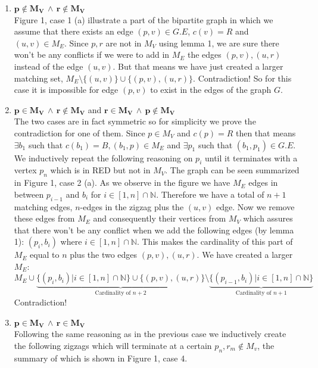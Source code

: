 \documentclass[10pt,a4paper]{article}
\begin{document}
\begin{enumerate}
\item $\mathbf{p \not \in M_V \, \land \, r\not\in M_V}$\\
Figure 1, case 1 (a) illustrate a part of the bipartite graph in which we assume that there exists an edge $(p,v) \in G.E$, $c(v) = R$ and $(u,v) \in M_E$. Since $p,r$ are not in $M_V$ using lemma 1, we are sure there won't be any conflicts if we were to add in $M_E$ the edges $(p,v), (u,r)$ instead of the edge $(u,v)$. But that means we have just created a larger matching set, $M_E\setminus \{(u,v)\} \cup \{(p,v),(u,r)\}$. Contradiction! So for this case it is impossible for edge $(p,v)$ to exist in the edges of the graph $G$.

\item $\mathbf{p \in M_V \, \land \, r\not\in M_V}$   and    $\mathbf{r \in M_V \, \land \, p\not\in M_V}$  \\
The two cases are in fact symmetric so for simplicity we prove the contradiction for one of them. Since $p \in M_V$ and $c(p) = R$ then that means $\exists b_1$ such that $c(b_1) = B, (b_1, p) \in M_E$ and $\exists p_1 $ such that $ (b_1, p_1) \in G.E$. We inductively repeat the following reasoning on $p_i$ until it terminates with a vertex $p_n$ which is in RED but not in $M_V$. The graph can be seen summarized in Figure 1, case 2 (a). As we observe in the figure we have $M_E$ edges in between $p_{i-1}$ and $b_i$ for $i \in [1,n] \cap \mathbb{N}$. Therefore we have a total of $n + 1$ matching edges,  $n$-edges in the zigzag plus the $(u,v)$ edge. 
Now we remove these edges from $M_E$ and consequently their vertices from $M_V$ which assures that there won't be any conflict when we add the following edges (by lemma 1):  $(p_{i},b_i)$ where $i \in  [1,n] \cap \mathbb{N}$. This makes the cardinality of this part of $M_E$ equal to $n$ plus the two edges $(p,v), (u,r)$. We have created a larger $M_E$:
$$
M_E \cup \underbrace{\{ (p_i, b_i) | i \in [1, n] \cap \mathbb{N}  \} \cup \{(p,v), (u,r)\}}_{\text{Cardinality of } n + 2} \setminus \underbrace{\{ (p_{i-1}, b_i) | i \in [1, n] \cap \mathbb{N} \}}_{\text{Cardinality of } n + 1}
$$
Contradiction!
\break
\item $\mathbf{p \in M_V \, \land \, r\in M_V}$\\
Following the same reasoning as in the previous case we inductively create the following zigzags which will terminate at a certain $p_n, r_m \not\in M_v$, the summary of which is shown in Figure 1, case 4.

\end{enumerate}
\end{document}
